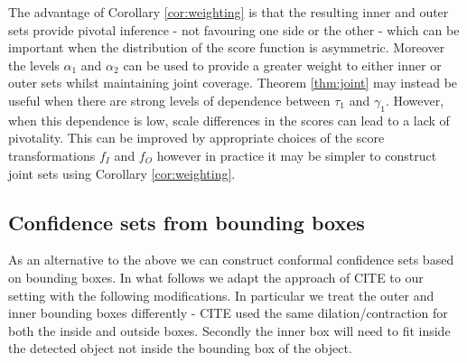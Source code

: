\begin{remark}
	The advantage of Corollary \ref{cor:weighting} is that the resulting inner and outer sets provide pivotal inference - not favouring one side or the other - which can be important when the distribution of the score function is asymmetric. Moreover the levels $\alpha_1$ and $\alpha_2$ can be used to provide a greater weight to either inner or outer sets whilst maintaining joint coverage. Theorem \ref{thm:joint} may instead be useful when there are strong levels of dependence between $\tau_1$ and $\gamma_1$. However, when this dependence is low, scale differences in the scores can lead to a lack of pivotality. This can be improved by appropriate choices of the score transformations $f_I$ and $f_O$ however in practice it may be simpler to construct joint sets using Corollary \ref{cor:weighting}. 
\end{remark}

\subsection{Confidence sets from bounding boxes}
As an alternative to the above we can construct conformal confidence sets based on bounding boxes. In what follows we adapt the approach of CITE to our setting with the following modifications. In particular we treat the outer and inner bounding boxes differently - CITE used the same dilation/contraction for both the inside and outside boxes. Secondly the inner box will need to fit inside the detected object not inside the bounding box of the object. 

